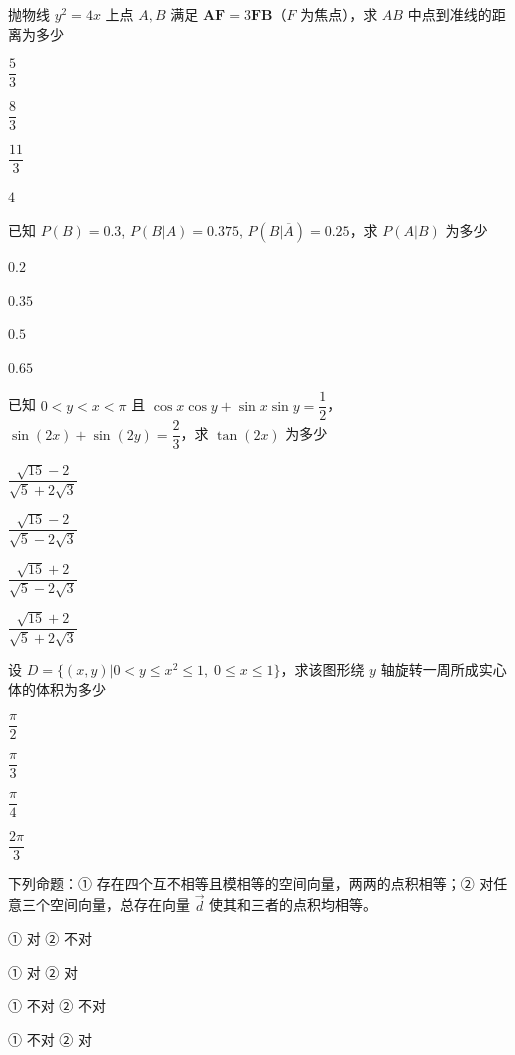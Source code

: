 \documentclass{exam-zh}
\begin{document}
\begin{question}
抛物线 $y^2=4x$ 上点 $A,B$ 满足 $\mathbf{AF}=3\mathbf{FB}$（$F$ 为焦点），求 $AB$ 中点到准线的距离为多少 \paren[]
\begin{choices}
  \item $\dfrac{5}{3}$
  \item $\dfrac{8}{3}$
  \item $\dfrac{11}{3}$
  \item $4$
\end{choices}
\end{question}

\begin{question}
已知 $P(B)=0.3$, $P(B|A)=0.375$, $P(B|\overline{A})=0.25$，求 $P(A|B)$ 为多少 \paren[]
\begin{choices}
  \item $0.2$
  \item $0.35$
  \item $0.5$
  \item $0.65$
\end{choices}
\end{question}

\begin{question}
已知 $0<y<x<\pi$ 且 $\cos x\cos y+\sin x\sin y=\dfrac{1}{2}$，$\sin(2x)+\sin(2y)=\dfrac{2}{3}$，求 $\tan(2x)$ 为多少 \paren[]
\begin{choices}
  \item $\dfrac{\sqrt{15}-2}{\sqrt{5}+2\sqrt{3}}$
  \item $\dfrac{\sqrt{15}-2}{\sqrt{5}-2\sqrt{3}}$
  \item $\dfrac{\sqrt{15}+2}{\sqrt{5}-2\sqrt{3}}$
  \item $\dfrac{\sqrt{15}+2}{\sqrt{5}+2\sqrt{3}}$
\end{choices}
\end{question}

\begin{question}
设 $D=\{(x,y)|0<y\le x^2\le1,\;0\le x\le1\}$，求该图形绕 $y$ 轴旋转一周所成实心体的体积为多少 \paren[]
\begin{choices}
  \item $\dfrac{\pi}{2}$
  \item $\dfrac{\pi}{3}$
  \item $\dfrac{\pi}{4}$
  \item $\dfrac{2\pi}{3}$
\end{choices}
\end{question}

\begin{question}
下列命题：① 存在四个互不相等且模相等的空间向量，两两的点积相等；② 对任意三个空间向量，总存在向量 $\vec{d}$ 使其和三者的点积均相等。 \paren[]
\begin{choices}
  \item ① 对 ② 不对
  \item ① 对 ② 对
  \item ① 不对 ② 不对
  \item ① 不对 ② 对
\end{choices}
\end{question}
\end{document}
